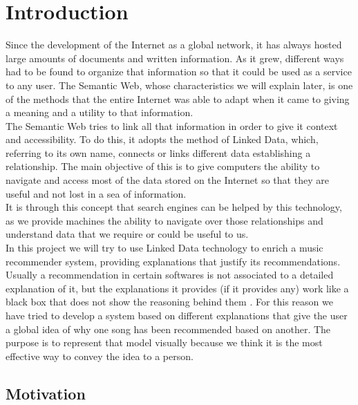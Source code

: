\chapter{Introduction}
\label{cap:introduction}

Since the development of the Internet as a global network, it has always hosted large amounts of documents and written information. As it grew, different ways had to be found to organize that information so that it could be used as a service to any user. The Semantic Web, whose characteristics we will explain later, is one of the methods that the entire Internet was able to adapt when it came to giving a meaning and a utility to that information.\\

The Semantic Web tries to link all that information in order to give it context and accessibility. To do this, it adopts the method of Linked Data, which, referring to its own name, connects or links different data establishing a relationship. The main objective of this is to give computers the ability to navigate and access most of the data stored on the Internet so that they are useful and not lost in a sea of information.\\

It is through this concept that search engines can be helped by this technology, as we provide machines the ability to navigate over those relationships and understand data that we require or could be useful to us.\\

In this project we will try to use Linked Data technology to enrich a music recommender system, providing explanations that justify its recommendations.\\

Usually a recommendation in certain softwares is not associated to a detailed explanation of it, but the explanations it provides (if it provides any) work like a black box that does not show the reasoning behind them \cite{tintarev2011}. For this reason we have tried to develop a system based on different explanations that give the user a global idea of why one song has been recommended based on another. The purpose is to represent that model visually because we think it is the most effective way to convey the idea to a person.\\

\section{Motivation}

